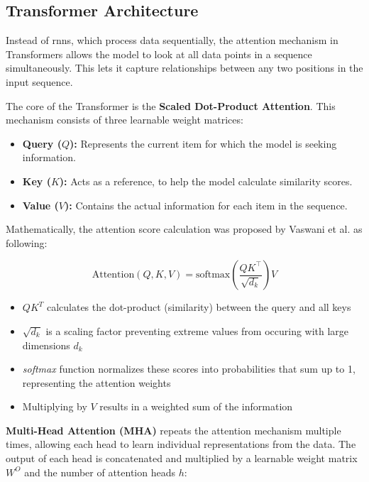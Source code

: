 \documentclass[12pt,twoside=false,a4paper,parskip]{scrbook}
\begin{document}
\subsection{Transformer Architecture}

Instead of \glspl{rnn}, which process data sequentially, the attention mechanism in Transformers allows the model to look at all data points in a sequence simultaneously. This lets it capture relationships between any two positions in the input sequence. 

The core of the Transformer is the \textbf{Scaled Dot-Product Attention}. This mechanism consists of three learnable weight matrices:

\begin{itemize}
    \item \textbf{Query ($Q$):} Represents the current item for which the model is seeking information.
    \item \textbf{Key ($K$):} Acts as a reference, to help the model calculate similarity scores.
    \item \textbf{Value ($V$):} Contains the actual information for each item in the sequence.
\end{itemize}

Mathematically, the attention score calculation was proposed by Vaswani et al. \cite{NIPS2017_Attention_is_All_you_Need} as following:

\begin{equation}
    \text{Attention}(Q, K, V) = \text{softmax}\left(\frac{QK^\top}{\sqrt{d_k}}\right)V
\end{equation}

\begin{itemize}
    \item $QK^T$ calculates the dot-product (similarity) between the query and all keys 
    \item $\sqrt{d_k}$ is a scaling factor preventing extreme values from occuring with large dimensions $d_k$
    \item \textit{softmax} function normalizes these scores into probabilities that sum up to 1, representing the attention weights
    \item Multiplying by $V$ results in a weighted sum of the information
\end{itemize}

\textbf{Multi-Head Attention (MHA)} repeats the attention mechanism multiple times, allowing each head to learn individual representations from the data. The output of each head is concatenated and multiplied by a learnable weight matrix $W^O$ and the number of attention heads $h$:
\end{document}
